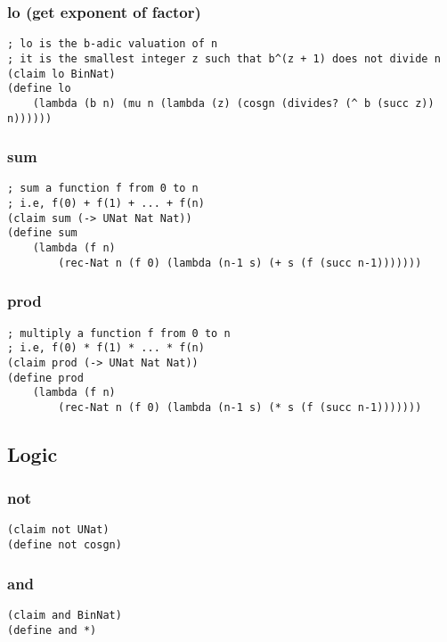 \subsubsection{lo (get exponent of factor)} \label{code:lo}
\begin{verbatim}
; lo is the b-adic valuation of n
; it is the smallest integer z such that b^(z + 1) does not divide n
(claim lo BinNat)
(define lo
    (lambda (b n) (mu n (lambda (z) (cosgn (divides? (^ b (succ z)) n))))))
\end{verbatim}

\subsubsection{sum} \label{code:sum}
\begin{verbatim}
; sum a function f from 0 to n
; i.e, f(0) + f(1) + ... + f(n)
(claim sum (-> UNat Nat Nat))
(define sum
    (lambda (f n)
        (rec-Nat n (f 0) (lambda (n-1 s) (+ s (f (succ n-1)))))))
\end{verbatim}

\subsubsection{prod} \label{code:prod}
\begin{verbatim}
; multiply a function f from 0 to n
; i.e, f(0) * f(1) * ... * f(n)
(claim prod (-> UNat Nat Nat))
(define prod
    (lambda (f n)
        (rec-Nat n (f 0) (lambda (n-1 s) (* s (f (succ n-1)))))))
\end{verbatim}


\subsection{Logic}

\subsubsection{not} \label{code:not}
\begin{verbatim}
(claim not UNat)
(define not cosgn)
\end{verbatim}

\subsubsection{and} \label{code:and}
\begin{verbatim}
(claim and BinNat)
(define and *)
\end{verbatim}

